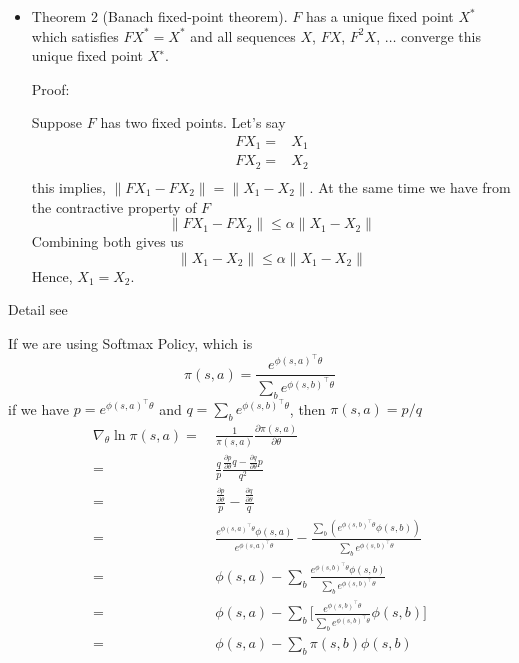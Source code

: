 \documentclass[9pt]{article}
\begin{document}
\begin{itemize}
\item Theorem 2 (Banach fixed-point theorem). $F$ has a unique fixed point $X^*$ which satisfies $FX^* = X^*$ and all
sequences $X$, $FX$, $F^2X$, $\ldots$ converge this unique fixed point $X^∗$.

Proof:

Suppose $F$ has two fixed points. Let's say
\begin{displaymath}
  \begin{split}
  FX_1 = & X_1\\
  FX_2 = & X_2\\
  \end{split}
\end{displaymath}
this implies, $\| FX_1 - FX_2\| = \| X_1-X_2 \|$. At the same time we have from the contractive property of $F$ 
\begin{displaymath}
  \|FX_1-FX_2\| \le \alpha \|X_1-X_2\|
\end{displaymath}
Combining both gives us 
\[
\|X_1-X_2\| \le \alpha\|X_1-X_2\|
\]
Hence, $X_1=X_2$.
\end{itemize}

Detail see \citep{conrad2014contraction}



If we are using Softmax Policy, which is 
\[
\pi(s,a) = \frac{e^{\phi(s,a)^{\top}\theta}}{\sum_{b}e^{\phi(s,b)^{\top}\theta}}
\]
if we have $p = e^{\phi(s,a)^{\top}\theta}$ and $q = \sum_{b}e^{\phi(s,b)^{\top}\theta}$, then $\pi(s,a) = p/q$
\[
\begin{split}
\nabla_{\theta} \ln \pi(s,a) =\ & \frac{1}{\pi(s,a)} \frac{\partial \pi(s,a)}{\partial \theta}\\
=\ & \frac{q}{p} \frac{\frac{\partial p}{\partial \theta} q - \frac{\partial q}{\partial \theta} p}{q^2}\\
=\ & \frac{\frac{\partial p}{\partial \theta}}{p} - \frac{\frac{\partial q}{\partial \theta}}{q}\\
=\ & \frac{e^{\phi(s,a)^{\top}\theta} \phi(s,a)}{e^{\phi(s,a)^{\top}\theta}} - \frac{\sum_{b} (e^{\phi(s,b)^{\top}\theta} \phi(s,b))}{\sum_{b}e^{\phi(s,b)^{\top}\theta}}\\
=\ & \phi(s,a) - \sum_{b} \frac{e^{\phi(s,b)^{\top}\theta} \phi(s,b)}{\sum_{b}e^{\phi(s,b)^{\top}\theta}}\\
=\ & \phi(s,a) - \sum_{b} \big[\frac{e^{\phi(s,b)^{\top}\theta}}{\sum_{b}e^{\phi(s,b)^{\top}\theta}} \phi(s,b)\big]\\
=\ & \phi(s,a) - \sum_{b} \pi(s,b) \phi(s,b)\\
\end{split}
\]
\end{document}
